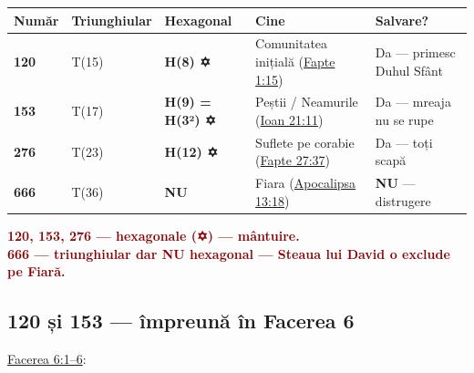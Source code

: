 \documentclass[12pt,a4paper,twoside,openany]{book}
\begin{document}
\begin{center}
\footnotesize
\begin{tabular}{L{0.8cm}L{2.0cm}L{2.3cm}L{5.4cm}L{3.9cm}}
\toprule
{}
\textbf{Număr} & \textbf{Triunghiular} & \textbf{Hexagonal} & \textbf{Cine} & \textbf{Salvare?} \\
\midrule
{}
\textbf{120} & T(15) & \textbf{H(8) ✡} & Comunitatea inițială (\href{https://bibliaortodoxa.ro/carte.php?id=26\&cap=1\#15}{Fapte 1:15}) & Da — primesc Duhul Sfânt \\
\textbf{153} & T(17) & \textbf{H(9) = H(3²) ✡} & Peștii / Neamurile (\href{https://bibliaortodoxa.ro/carte.php?id=35\&cap=21\#11}{Ioan 21:11}) & Da — mreaja nu se rupe \\
\textbf{276} & T(23) & \textbf{H(12) ✡} & Suflete pe corabie (\href{https://bibliaortodoxa.ro/carte.php?id=26\&cap=27\#37}{Fapte 27:37}) & Da — toți scapă \\
\textbf{666} & T(36) & \textbf{NU} & Fiara (\href{https://bibliaortodoxa.ro/carte.php?id=4\&cap=13\#18}{Apocalipsa 13:18}) & \textbf{NU} — distrugere \\
\bottomrule
\end{tabular}
\end{center}
\normalsize
\textcolor{darkred}{\textbf{120, 153, 276 — hexagonale (✡) — mântuire. \\
666 — triunghiular dar NU hexagonal — Steaua lui David o exclude pe Fiară.}}


\subsection{120 și 153 — împreună în Facerea 6}
\href{https://bibliaortodoxa.ro/carte.php?id=25\&cap=6\#1}{Facerea 6:1–6}:
\end{document}
